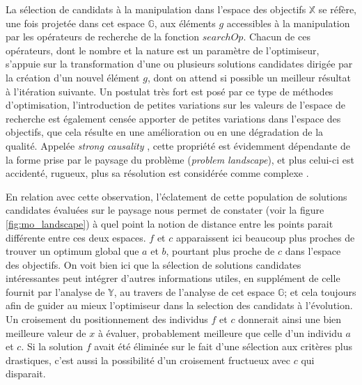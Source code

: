 La sélection de candidats à la manipulation dans l'espace des objectifs $\mathbb{X}$ se réfère, une fois projetée dans cet espace $\mathbb{G}$, aux éléments $g$ accessibles à la manipulation par les opérateurs de recherche de la fonction $searchOp$. Chacun de ces opérateurs, dont le nombre et la nature est un paramètre de l'optimiseur, s'appuie sur la transformation d'une ou plusieurs solutions candidates dirigée par la création d'un nouvel élément $g$, dont on attend si possible un meilleur résultat à l'itération suivante. Un postulat très fort est posé par ce type de méthodes d'optimisation, l'introduction de petites variations sur les valeurs de l'espace de recherche est également censée apporter de petites variations dans l'espace des objectifs, que cela résulte en une amélioration ou en une dégradation de la qualité. Appelée \textit{strong causality} , cette propriété est évidemment dépendante de la forme prise par le paysage du problème (\textit{problem landscape}), et plus celui-ci est accidenté, rugueux, plus sa résolution est considérée comme complexe .

En relation avec cette observation, l'éclatement de cette population de solutions candidates évaluées sur le paysage nous permet de constater (voir la figure \ref{fig:mo_landscape}) à quel point la notion de distance entre les points parait différente entre ces deux espaces. $f$ et $c$ apparaissent ici beaucoup plus proches de trouver un optimum global que $a$ et $b$, pourtant plus proche de $c$ dans l'espace des objectifs. On voit bien ici que la sélection de solutions candidates intéressantes peut intégrer d'autres informations utiles, en supplément de celle fournit par l'analyse de $\mathbb{Y}$, au travers de l'analyse de cet espace $\mathbb{G}$; et cela toujours afin de guider au mieux l'optimiseur dans la selection des candidats à l'évolution. Un croisement du positionnement des individus $f$ et $c$ donnerait ainsi une bien meilleure valeur de $x$ à évaluer, probablement meilleure que celle d'un individu $a$ et $c$. Si la solution $f$ avait été éliminée sur le fait d'une sélection aux critères plus drastiques, c'est aussi la possibilité d'un croisement fructueux avec $c$ qui disparait.


